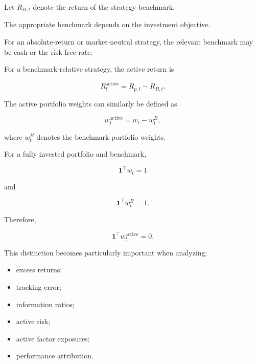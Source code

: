 \documentclass[11pt,a4paper]{article}
\begin{document}
Let $R_{B,t}$ denote the return of the strategy benchmark.

The appropriate benchmark depends on the investment objective.

For an absolute-return or market-neutral strategy, the relevant benchmark may
be cash or the risk-free rate.

For a benchmark-relative strategy, the active return is

\begin{equation}
R_t^{\mathrm{active}}
=
R_{p,t}
-
R_{B,t}.
\end{equation}

The active portfolio weights can similarly be defined as

\begin{equation}
w_t^{\mathrm{active}}
=
w_t-w_t^B,
\end{equation}

where $w_t^B$ denotes the benchmark portfolio weights.

For a fully invested portfolio and benchmark,

\begin{equation}
\mathbf{1}^{\top}w_t
=
1
\end{equation}

and

\begin{equation}
\mathbf{1}^{\top}w_t^B
=
1.
\end{equation}

Therefore,

\begin{equation}
\mathbf{1}^{\top}
w_t^{\mathrm{active}}
=
0.
\end{equation}

This distinction becomes particularly important when analyzing:

\begin{itemize}
    \item excess returns;

    \item tracking error;

    \item information ratios;

    \item active risk;

    \item active factor exposures;

    \item performance attribution.
\end{itemize}
\end{document}
